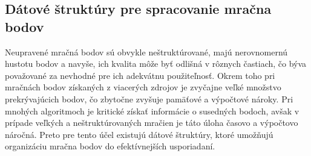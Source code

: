 \subsection{Dátové štruktúry pre spracovanie mračna bodov}
\noindent Neupravené mračná bodov sú obvykle neštruktúrované, majú nerovnomernú hustotu bodov a navyše, ich kvalita môže byť odlišná v rôznych častiach, čo býva považované za nevhodné pre ich adekvátnu použiteľnosť. Okrem toho pri mračnách bodov získaných z viacerých zdrojov je zvyčajne veľké množstvo prekrývajúcich bodov, čo zbytočne zvyšuje pamäťové a výpočtové nároky. \cite{voxel_grid} \cite{struktury} \newline\indent Pri mnohých algoritmoch je kritické získať informácie o susedných bodoch, avšak v prípade veľkých a neštruktúrovaných mračien je táto úloha časovo a výpočtovo náročná. Preto pre tento účel existujú dátové štruktúry, ktoré umožňujú organizáciu mračna bodov do efektívnejších usporiadaní.

